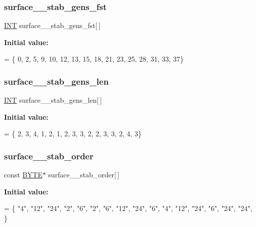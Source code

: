 \subsubsection{\texorpdfstring{surface\+\_\+\_\+stab\+\_\+gens\+\_\+fst}{surface\_23\_stab\_gens\_fst}}
{\footnotesize\ttfamily \mbox{\hyperlink{galois_8h_a09fddde158a3a20bd2dcadb609de11dc}{I\+NT}} surface\+\_\+\_\+stab\+\_\+gens\+\_\+fst\mbox{[}$\,$\mbox{]}}

{\bfseries Initial value\+:}
\begin{DoxyCode}
= \{ 0, 2, 5, 9, 10, 12, 13, 15, 18, 21, 
    23, 25, 28, 31, 33, 37\}
\end{DoxyCode}
\mbox{\label{surface__23_8_c_a9a6f4d6e08fa2acd1e36b6dc4f1b5e92}} 
\subsubsection{\texorpdfstring{surface\+\_\+\_\+stab\+\_\+gens\+\_\+len}{surface\_23\_stab\_gens\_len}}
{\footnotesize\ttfamily \mbox{\hyperlink{galois_8h_a09fddde158a3a20bd2dcadb609de11dc}{I\+NT}} surface\+\_\+\_\+stab\+\_\+gens\+\_\+len\mbox{[}$\,$\mbox{]}}

{\bfseries Initial value\+:}
\begin{DoxyCode}
= \{ 2, 3, 4, 1, 2, 1, 2, 3, 3, 2, 
    2, 3, 3, 2, 4, 3\}
\end{DoxyCode}
\mbox{\label{surface__23_8_c_a1679d74959335b9aa2089fe3d427a3ba}} 
\subsubsection{\texorpdfstring{surface\+\_\+\_\+stab\+\_\+order}{surface\_23\_stab\_order}}
{\footnotesize\ttfamily const \mbox{\hyperlink{galois_8h_ab6cc7b4aeb6ea31aba2b3fbfc83ff5e6}{B\+Y\+TE}}$\ast$ surface\+\_\+\_\+stab\+\_\+order\mbox{[}$\,$\mbox{]}}

{\bfseries Initial value\+:}
\begin{DoxyCode}
= \{
    \textcolor{stringliteral}{"4"},
    \textcolor{stringliteral}{"12"},
    \textcolor{stringliteral}{"24"},
    \textcolor{stringliteral}{"2"},
    \textcolor{stringliteral}{"6"},
    \textcolor{stringliteral}{"2"},
    \textcolor{stringliteral}{"6"},
    \textcolor{stringliteral}{"12"},
    \textcolor{stringliteral}{"24"},
    \textcolor{stringliteral}{"6"},
    \textcolor{stringliteral}{"4"},
    \textcolor{stringliteral}{"12"},
    \textcolor{stringliteral}{"24"},
    \textcolor{stringliteral}{"6"},
    \textcolor{stringliteral}{"24"},
    \textcolor{stringliteral}{"24"},
\}
\end{DoxyCode}
